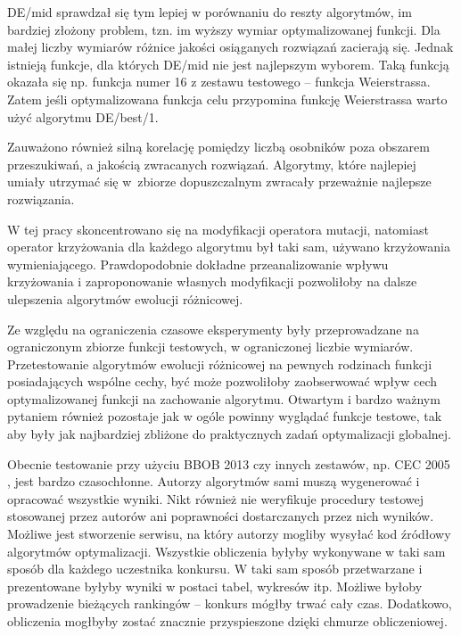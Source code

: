 \documentclass[a4paper,onecolumn,oneside,12pt,wide,floatssmall]{mwrep}
\theoremstyle{definition}
\theoremstyle{plain}%
\theoremstyle{remark}
\begin{document}
DE/mid sprawdzał się tym lepiej w porównaniu do reszty algorytmów, im bardziej
złożony problem, tzn. im wyższy wymiar optymalizowanej funkcji. Dla małej liczby wymiarów
różnice jakości osiąganych rozwiązań zacierają się. Jednak istnieją funkcje, dla których DE/mid nie jest najlepszym wyborem. Taką funkcją okazała się np.
funkcja numer 16 z zestawu testowego -- funkcja Weierstrassa. Zatem jeśli optymalizowana funkcja celu
przypomina funkcję Weierstrassa warto użyć algorytmu DE/best/1.

Zauważono również silną korelację pomiędzy liczbą osobników poza obszarem przeszukiwań,
a jakością zwracanych rozwiązań. Algorytmy, które najlepiej umiały utrzymać się w~zbiorze 
dopuszczalnym zwracały przeważnie najlepsze rozwiązania. 


W tej pracy skoncentrowano się na modyfikacji operatora mutacji, natomiast operator krzyżowania
dla każdego algorytmu był taki sam, używano krzyżowania wymieniającego. Prawdopodobnie dokładne
przeanalizowanie wpływu krzyżowania i zaproponowanie własnych modyfikacji 
pozwoliłoby na dalsze ulepszenia algorytmów ewolucji różnicowej. 

Ze względu na ograniczenia czasowe eksperymenty były przeprowadzane na ograniczonym zbiorze
funkcji testowych, w ograniczonej liczbie wymiarów. Przetestowanie algorytmów ewolucji
różnicowej na pewnych rodzinach funkcji posiadających wspólne cechy, być może pozwoliłoby
zaobserwować wpływ cech optymalizowanej funkcji na zachowanie algorytmu. 
Otwartym i bardzo ważnym pytaniem również pozostaje jak w ogóle powinny wyglądać funkcje testowe, 
tak aby były jak najbardziej zbliżone do praktycznych zadań
optymalizacji globalnej.

Obecnie testowanie przy użyciu BBOB 2013 czy innych zestawów, np. CEC 2005 \cite{cec},
jest bardzo czasochłonne. Autorzy algorytmów sami muszą wygenerować i opracować wszystkie 
wyniki.
Nikt również nie weryfikuje procedury testowej stosowanej przez autorów ani poprawności
dostarczanych przez nich wyników. Możliwe jest stworzenie serwisu, na który autorzy mogliby
wysyłać kod źródłowy algorytmów optymalizacji. Wszystkie obliczenia byłyby wykonywane w taki
sam sposób dla każdego uczestnika konkursu. W taki sam sposób przetwarzane i prezentowane byłyby 
wyniki w postaci tabel, wykresów itp. Możliwe byłoby prowadzenie bieżących rankingów -- konkurs
mógłby trwać cały czas. Dodatkowo, obliczenia mogłbyby zostać znacznie przyspieszone
dzięki chmurze obliczeniowej.
\end{document}
